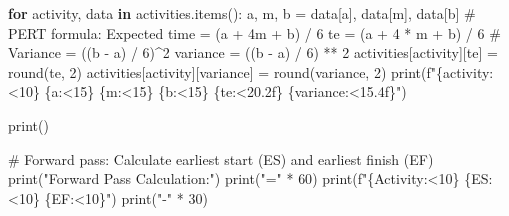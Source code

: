 \documentclass[
  letterpaper,
  DIV=11,
  numbers=noendperiod]{scrreprt}
\newenvironment{Shaded}{\begin{snugshade}}{\end{snugshade}}
\newcommand{\BuiltInTok}[1]{\textcolor[rgb]{0.00,0.23,0.31}{#1}}
\newcommand{\CommentTok}[1]{\textcolor[rgb]{0.37,0.37,0.37}{#1}}
\newcommand{\ControlFlowTok}[1]{\textcolor[rgb]{0.00,0.23,0.31}{\textbf{#1}}}
\newcommand{\DecValTok}[1]{\textcolor[rgb]{0.68,0.00,0.00}{#1}}
\newcommand{\KeywordTok}[1]{\textcolor[rgb]{0.00,0.23,0.31}{\textbf{#1}}}
\newcommand{\NormalTok}[1]{\textcolor[rgb]{0.00,0.23,0.31}{#1}}
\newcommand{\OperatorTok}[1]{\textcolor[rgb]{0.37,0.37,0.37}{#1}}
\newcommand{\SpecialCharTok}[1]{\textcolor[rgb]{0.37,0.37,0.37}{#1}}
\newcommand{\SpecialStringTok}[1]{\textcolor[rgb]{0.13,0.47,0.30}{#1}}
\newcommand{\StringTok}[1]{\textcolor[rgb]{0.13,0.47,0.30}{#1}}
\begin{document}
\begin{Shaded}
\begin{Highlighting}[]
    \ControlFlowTok{for}\NormalTok{ activity, data }\KeywordTok{in}\NormalTok{ activities.items():}
\NormalTok{        a, m, b }\OperatorTok{=}\NormalTok{ data[}\StringTok{\textquotesingle{}a\textquotesingle{}}\NormalTok{], data[}\StringTok{\textquotesingle{}m\textquotesingle{}}\NormalTok{], data[}\StringTok{\textquotesingle{}b\textquotesingle{}}\NormalTok{]}
        \CommentTok{\# PERT formula: Expected time = (a + 4m + b) / 6}
\NormalTok{        te }\OperatorTok{=}\NormalTok{ (a }\OperatorTok{+} \DecValTok{4} \OperatorTok{*}\NormalTok{ m }\OperatorTok{+}\NormalTok{ b) }\OperatorTok{/} \DecValTok{6}
        \CommentTok{\# Variance = ((b {-} a) / 6)\^{}2}
\NormalTok{        variance }\OperatorTok{=}\NormalTok{ ((b }\OperatorTok{{-}}\NormalTok{ a) }\OperatorTok{/} \DecValTok{6}\NormalTok{) }\OperatorTok{**} \DecValTok{2}
\NormalTok{        activities[activity][}\StringTok{\textquotesingle{}te\textquotesingle{}}\NormalTok{] }\OperatorTok{=} \BuiltInTok{round}\NormalTok{(te, }\DecValTok{2}\NormalTok{)}
\NormalTok{        activities[activity][}\StringTok{\textquotesingle{}variance\textquotesingle{}}\NormalTok{] }\OperatorTok{=} \BuiltInTok{round}\NormalTok{(variance, }\DecValTok{2}\NormalTok{)}
        \BuiltInTok{print}\NormalTok{(}\SpecialStringTok{f"}\SpecialCharTok{\{}\NormalTok{activity}\SpecialCharTok{:\textless{}10\}}\SpecialStringTok{ }\SpecialCharTok{\{}\NormalTok{a}\SpecialCharTok{:\textless{}15\}}\SpecialStringTok{ }\SpecialCharTok{\{}\NormalTok{m}\SpecialCharTok{:\textless{}15\}}\SpecialStringTok{ }\SpecialCharTok{\{}\NormalTok{b}\SpecialCharTok{:\textless{}15\}}\SpecialStringTok{ }\SpecialCharTok{\{}\NormalTok{te}\SpecialCharTok{:\textless{}20.2f\}}\SpecialStringTok{ }\SpecialCharTok{\{}\NormalTok{variance}\SpecialCharTok{:\textless{}15.4f\}}\SpecialStringTok{"}\NormalTok{)}
    
    \BuiltInTok{print}\NormalTok{()}
    
    \CommentTok{\# Forward pass: Calculate earliest start (ES) and earliest finish (EF)}
    \BuiltInTok{print}\NormalTok{(}\StringTok{"Forward Pass Calculation:"}\NormalTok{)}
    \BuiltInTok{print}\NormalTok{(}\StringTok{"="} \OperatorTok{*} \DecValTok{60}\NormalTok{)}
    \BuiltInTok{print}\NormalTok{(}\SpecialStringTok{f"}\SpecialCharTok{\{}\StringTok{\textquotesingle{}Activity\textquotesingle{}}\SpecialCharTok{:\textless{}10\}}\SpecialStringTok{ }\SpecialCharTok{\{}\StringTok{\textquotesingle{}ES\textquotesingle{}}\SpecialCharTok{:\textless{}10\}}\SpecialStringTok{ }\SpecialCharTok{\{}\StringTok{\textquotesingle{}EF\textquotesingle{}}\SpecialCharTok{:\textless{}10\}}\SpecialStringTok{"}\NormalTok{)}
    \BuiltInTok{print}\NormalTok{(}\StringTok{"{-}"} \OperatorTok{*} \DecValTok{30}\NormalTok{)}
    

\end{Highlighting}
\end{Shaded}
\end{document}
